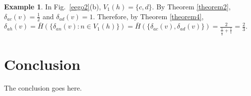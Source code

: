 \documentclass[journal]{IEEEtran}
\newcommand{\D}[3]{\delta_{{#1}{#2}}({#3})}
\newcommand{\V}[2]{V_{#2}({#1})}
\newcommand{\LV}[2]{V_{\le #2}({#1})}
\newcommand{\XN}[1]{\mathcal{X}_{{#1}}}
\theoremstyle{definition}
\newtheorem{example}[theorem]{Example}
\begin{document}
\begin{example}
In Fig.~\ref{eego2}(b), %
$\V{h}{1} = \{c,d\}$.
By Theorem \ref{theorem2}, $\D{a}{c}{v}=\frac{1}{2}$ and $\D{a}{d}{v}=1$.
Therefore, by Theorem \ref{theorem4}, $\D{a}{h}{v}\!=\!\bar{H}(\{\D{a}{n}{v} : n \in \V{h}{1}\})\!=\!\bar{H}(\{\D{a}{c}{v},\D{a}{d}{v}\})\!=\!\frac{2}{\frac{1}{\frac{1}{2}} + \frac{1}{1}}=\frac{2}{3}$.  
 
\end{example}




\section{Conclusion}
The conclusion goes here.
\end{document}
